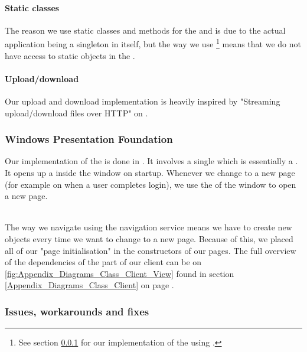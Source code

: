 \paragraph{Static classes}
The reason we use static classes and methods for the  and  is due to the actual application being a singleton in itself, but the way we use \footnote{See section \ref{Implementation_Client_Architecture_WPF} for our implementation of the  using .} means that we do not have access to static objects in the .

\paragraph{Upload/download} Our upload and download implementation is heavily inspired by "Streaming upload/download files over HTTP" on \cite{CODE:UPLDL}. 

\subsubsection{Windows Presentation Foundation}
\label{Implementation_Client_Architecture_WPF}
Our implementation of the  is done in . It involves a single  which is essentially a  . It opens up a  inside the window on startup. Whenever we change to a new page (for example on when a user completes login), we use the  of the window to open a new page.

\\The way we navigate using the navigation service means we have to create new  objects every time we want to change to a new page. Because of this, we placed all of our "page initialisation" in the constructors of our pages. The full overview of the dependencies of the  part of our client can be on \ref{fig:Appendix_Diagrams_Class_Client_View} found in section \ref{Appendix_Diagrams_Class_Client} on page \pageref{Appendix_Diagrams_Class_Client}.

\subsubsection{Issues, workarounds and fixes}
\label{Implementation_Client_Architecture_Issues}

